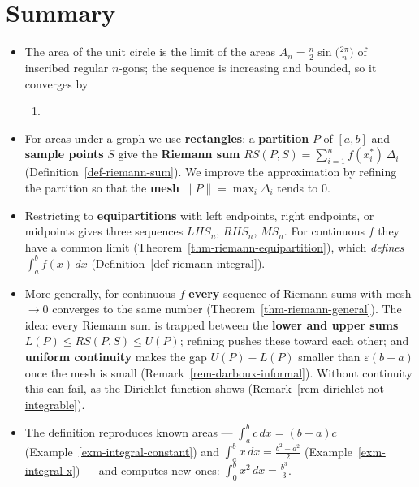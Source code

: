 \documentclass[
  letterpaper,
  DIV=11,
  numbers=noendperiod]{scrreprt}
\providecommand{\tightlist}{%
  \setlength{\itemsep}{0pt}\setlength{\parskip}{0pt}}
\theoremstyle{plain}
\theoremstyle{plain}
\theoremstyle{definition}
\theoremstyle{definition}
\theoremstyle{definition}
\theoremstyle{plain}
\theoremstyle{plain}
\theoremstyle{remark}
\begin{document}
\section{Summary}\label{summary-7}

\begin{itemize}
\tightlist
\item
  The area of the unit circle is the limit of the areas
  \(A_n = \frac n2\sin\!\big(\frac{2\pi}{n}\big)\) of inscribed regular
  \(n\)-gons; the sequence is increasing and bounded, so it converges by

  \begin{enumerate}
  \def\labelenumi{\arabic{enumi}.}
  \setcounter{enumi}{1}
  \tightlist
  \item
  \end{enumerate}
\item
  For areas under a graph we use \textbf{rectangles}: a
  \textbf{partition} \(P\) of \([a,b]\) and \textbf{sample points} \(S\)
  give the \textbf{Riemann sum}
  \(RS(P,S) = \sum_{i=1}^n f(x_i^*)\,\Delta_i\)
  (Definition~\ref{def-riemann-sum}). We improve the approximation by
  refining the partition so that the \textbf{mesh}
  \(\|P\|=\max_i\Delta_i\) tends to \(0\).
\item
  Restricting to \textbf{equipartitions} with left endpoints, right
  endpoints, or midpoints gives three sequences \(LHS_n\), \(RHS_n\),
  \(MS_n\). For continuous \(f\) they have a common limit
  (Theorem~\ref{thm-riemann-equipartition}), which \emph{defines}
  \(\int_a^b f(x)\,dx\) (Definition~\ref{def-riemann-integral}).
\item
  More generally, for continuous \(f\) \textbf{every} sequence of
  Riemann sums with mesh \(\to0\) converges to the same number
  (Theorem~\ref{thm-riemann-general}). The idea: every Riemann sum is
  trapped between the \textbf{lower and upper sums}
  \(L(P)\le RS(P,S)\le U(P)\); refining pushes these toward each other;
  and \textbf{uniform continuity} makes the gap \(U(P)-L(P)\) smaller
  than \(\varepsilon(b-a)\) once the mesh is small
  (Remark~\ref{rem-darboux-informal}). Without continuity this can fail,
  as the Dirichlet function shows
  (Remark~\ref{rem-dirichlet-not-integrable}).
\item
  The definition reproduces known areas --- \(\int_a^b c\,dx = (b-a)c\)
  (Example~\ref{exm-integral-constant}) and
  \(\int_a^b x\,dx = \frac{b^2-a^2}{2}\) (Example~\ref{exm-integral-x})
  --- and computes new ones: \(\int_0^b x^2\,dx = \frac{b^3}{3}\).
\end{itemize}
\end{document}
